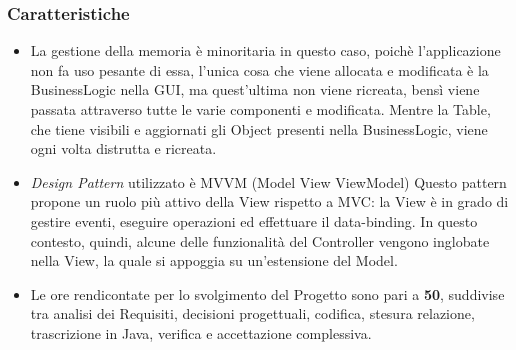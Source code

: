 \documentclass[10pt]{beamer}
\begin{document}
\begin{frame}
\frametitle{Caratteristiche}
\begin{itemize}
\item La gestione della memoria è minoritaria in questo caso, poichè l'applicazione non fa uso pesante di essa, l'unica cosa che viene allocata e modificata è la BusinessLogic nella GUI, ma quest'ultima non viene ricreata, bensì viene passata attraverso tutte le varie componenti e modificata.
Mentre la Table, che tiene visibili e aggiornati gli Object presenti nella BusinessLogic, viene ogni volta distrutta e ricreata.

\item \textit{Design Pattern} utilizzato è MVVM (Model View ViewModel) Questo pattern propone un ruolo più attivo della View rispetto a MVC: la View è in grado di gestire eventi, eseguire operazioni ed effettuare il data-binding. In questo contesto, quindi, alcune delle funzionalità del Controller vengono inglobate nella View, la quale si appoggia su un’estensione del Model.

\item Le ore rendicontate per lo svolgimento del Progetto sono pari a \textbf{50}, suddivise tra analisi dei Requisiti, decisioni progettuali, codifica, stesura relazione, trascrizione in Java, verifica e accettazione complessiva.
\end{itemize}
\end{frame}



\end{document}
